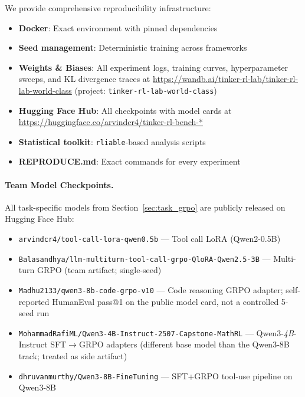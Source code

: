 \documentclass{article}
\begin{document}
We provide comprehensive reproducibility infrastructure:
\begin{itemize}
    \item \textbf{Docker}: Exact environment with pinned dependencies
    \item \textbf{Seed management}: Deterministic training across frameworks
    \item \textbf{Weights \& Biases}: All experiment logs, training curves,
    hyperparameter sweeps, and KL divergence traces at
    \url{https://wandb.ai/tinker-rl-lab/tinker-rl-lab-world-class}
    (project: \texttt{tinker-rl-lab-world-class})
    \item \textbf{Hugging Face Hub}: All checkpoints with model cards at
    \url{https://huggingface.co/arvindcr4/tinker-rl-bench-*}
    \item \textbf{Statistical toolkit}: \texttt{rliable}-based analysis scripts
    \item \textbf{REPRODUCE.md}: Exact commands for every experiment
\end{itemize}

\paragraph{Team Model Checkpoints.}
All task-specific models from Section~\ref{sec:task_grpo} are publicly released
on Hugging Face Hub:
\begin{itemize}
    \item \texttt{arvindcr4/tool-call-lora-qwen0.5b} --- Tool call LoRA (Qwen2-0.5B)
    \item \texttt{Balasandhya/llm-multiturn-tool-call-grpo-QloRA-Qwen2.5-3B} --- Multi-turn GRPO (team artifact; single-seed)
    \item \texttt{Madhu2133/qwen3-8b-code-grpo-v10} --- Code reasoning GRPO adapter; self-reported HumanEval pass@1 on the public model card, not a controlled 5-seed run
    \item \texttt{MohammadRafiML/Qwen3-4B-Instruct-2507-Capstone-MathRL} --- Qwen3-\emph{4B}-Instruct SFT$\to$GRPO adapters (different base model than the Qwen3-8B track; treated as side artifact)
    \item \texttt{dhruvanmurthy/Qwen3-8B-FineTuning} --- SFT+GRPO tool-use pipeline on Qwen3-8B
\end{itemize}

\end{document}
